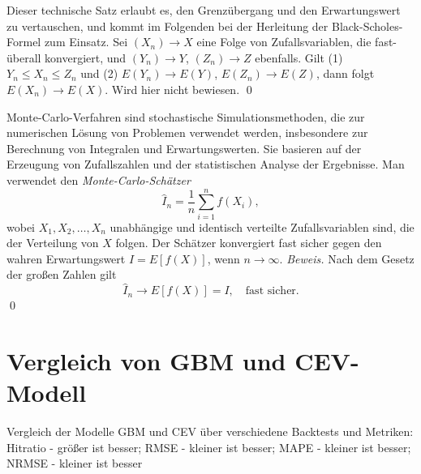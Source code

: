 \begin{satz}
Dieser technische Satz erlaubt es, den Grenzübergang und den Erwartungswert zu vertauschen, und
kommt im Folgenden bei der Herleitung der Black-Scholes-Formel zum Einsatz.
Sei $(X_n) \longrightarrow X$ eine Folge von Zufallsvariablen, die fast-überall konvergiert,
und $(Y_n) \longrightarrow Y$, $(Z_n) \longrightarrow Z$ ebenfalls.
Gilt (1) $Y_n \le X_n \le Z_n$ und (2) $E(Y_n) \longrightarrow E(Y)$, $E(Z_n) \longrightarrow E(Z)$,
dann folgt $E(X_n) \longrightarrow E(X)$. Wird hier nicht bewiesen. \qed
\end{satz}

\begin{defprop}
Monte-Carlo-Verfahren sind stochastische Simulationsmethoden, die zur numerischen
Lösung von Problemen verwendet werden, insbesondere zur Berechnung von Integralen
und Erwartungswerten. Sie basieren auf der Erzeugung von Zufallszahlen und
der statistischen Analyse der Ergebnisse. Man verwendet den \textit{Monte-Carlo-Schätzer}
$$
\hat{I}_n = \frac{1}{n} \sum_{i=1}^n f(X_i),
$$
wobei $X_1, X_2, \ldots, X_n$ unabhängige und identisch verteilte Zufallsvariablen
sind, die der Verteilung von $X$ folgen. Der Schätzer konvergiert fast sicher
gegen den wahren Erwartungswert $I = E[f(X)]$, wenn $n \to \infty$.
\textit{Beweis.} Nach dem Gesetz der großen Zahlen gilt
$$\hat{I}_n \longrightarrow E[f(X)] = I, \quad \text{fast sicher.}$$
\qed
\end{defprop}
\newpage
\section{Vergleich von GBM und CEV-Modell}
\begin{table}[H]
    \centering
    \begin{sideways}
    \end{sideways}
    \caption{Vergleich der Modelle GBM und CEV über verschiedene Backtests und Metriken: Hitratio - größer ist besser; RMSE - kleiner ist besser; MAPE - kleiner ist besser; NRMSE - kleiner ist besser} 
    \label{fig:table_gbm_cev}
\end{table}